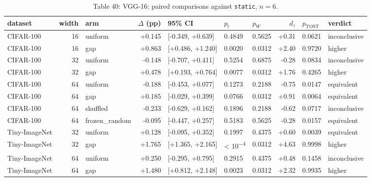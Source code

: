 \documentclass{article}
\begin{document}
\begin{table}
\caption{Table 40: VGG-16: paired comparisons against \texttt{static}, $n=6$.}

\begin{tabular}{l r l r l ll r l l}
\toprule
dataset & width & arm & $\Delta$ (pp) & 95\% CI & $p_t$ & $p_W$ & $d_z$ & $p_{\text{TOST}}$ & verdict \\
\midrule
CIFAR‑100 & 16 & uniform & +0.145 & [-0.349, +0.639] & 0.4849 & 0.5625 & +0.31 & 0.0621 & inconclusive \\
CIFAR‑100 & 16 & gap & +0.863 & [+0.486, +1.240] & 0.0020 & 0.0312 & +2.40 & 0.9720 & higher \\
CIFAR‑100 & 32 & uniform & -0.148 & [-0.707, +0.411] & 0.5254 & 0.6875 & -0.28 & 0.0834 & inconclusive \\
CIFAR‑100 & 32 & gap & +0.478 & [+0.193, +0.764] & 0.0077 & 0.0312 & +1.76 & 0.4265 & higher \\
CIFAR‑100 & 64 & uniform & -0.188 & [-0.453, +0.077] & 0.1273 & 0.2188 & -0.75 & 0.0147 & equivalent \\
CIFAR‑100 & 64 & gap & +0.185 & [-0.029, +0.399] & 0.0766 & 0.0312 & +0.91 & 0.0064 & equivalent \\
CIFAR‑100 & 64 & shuffled & -0.233 & [-0.629, +0.162] & 0.1896 & 0.2188 & -0.62 & 0.0717 & inconclusive \\
CIFAR‑100 & 64 & frozen\_random & -0.095 & [-0.447, +0.257] & 0.5183 & 0.5625 & -0.28 & 0.0157 & equivalent \\
Tiny‑ImageNet & 32 & uniform & +0.128 & [-0.095, +0.352] & 0.1997 & 0.4375 & +0.60 & 0.0039 & equivalent \\
Tiny‑ImageNet & 32 & gap & +1.765 & [+1.365, +2.165] & < 10\textsuperscript{−4} & 0.0312 & +4.63 & 0.9998 & higher \\
Tiny‑ImageNet & 64 & uniform & +0.250 & [-0.295, +0.795] & 0.2915 & 0.4375 & +0.48 & 0.1458 & inconclusive \\
Tiny‑ImageNet & 64 & gap & +1.480 & [+0.812, +2.148] & 0.0023 & 0.0312 & +2.32 & 0.9935 & higher \\
\bottomrule
\end{tabular}
\end{table}
\end{document}
